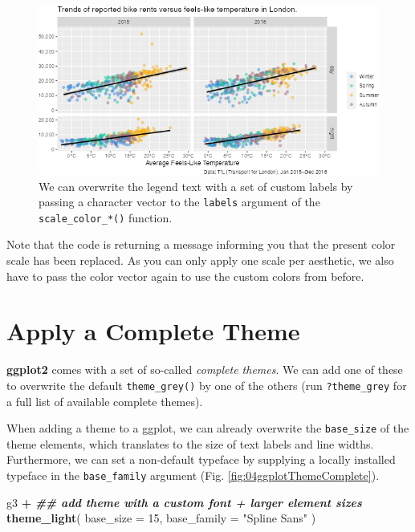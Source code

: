 \documentclass[
]{krantz}
\makeatletter
\newenvironment{Shaded}{\begin{snugshade}}{\end{snugshade}}
\newcommand{\AttributeTok}[1]{\textcolor[rgb]{0.27,0.27,0.27}{#1}}
\newcommand{\DecValTok}[1]{\textcolor[rgb]{0.06,0.06,0.06}{#1}}
\newcommand{\DocumentationTok}[1]{\textcolor[rgb]{0.37,0.37,0.37}{\textbf{\textit{#1}}}}
\newcommand{\FunctionTok}[1]{\textcolor[rgb]{0.27,0.27,0.27}{\textbf{#1}}}
\newcommand{\NormalTok}[1]{#1}
\newcommand{\SpecialCharTok}[1]{\textcolor[rgb]{0.43,0.43,0.43}{\textbf{#1}}}
\newcommand{\StringTok}[1]{\textcolor[rgb]{0.5,0.5,0.5}{#1}}
\newenvironment{kframe}{%
\medskip{}
\setlength{\fboxsep}{.8em}
 \def\at@end@of@kframe{}%
 \ifinner\ifhmode%
  \def\at@end@of@kframe{\end{minipage}}%
  \begin{minipage}{\columnwidth}%
 \fi\fi%
 \def\FrameCommand##1{\hskip\@totalleftmargin \hskip-\fboxsep
 \colorbox{shadecolor}{##1}\hskip-\fboxsep
     \hskip-\linewidth \hskip-\@totalleftmargin \hskip\columnwidth}%
 \MakeFramed {\advance\hsize-\width
   \@totalleftmargin\z@ \linewidth\hsize
   \@setminipage}}%
 {\par\unskip\endMakeFramed%
 \at@end@of@kframe}
\renewenvironment{Shaded}{\begin{kframe}}{\end{kframe}}
\makeatother
\begin{document}
\begin{figure}
\centering
\includegraphics{bookdown_files/figure-latex/04legendLabels-1.png}
\caption{\label{fig:04legendLabels}We can overwrite the legend text with a set of custom labels by passing a character vector to the \texttt{labels} argument of the \texttt{scale\_color\_*()} function.}
\end{figure}

Note that the code is returning a message informing you that the present color scale has been replaced. As you can only apply one scale per aesthetic, we also have to pass the color vector again to use the custom colors from before.

\hypertarget{complete-themes}{%
\section{Apply a Complete Theme}\label{complete-themes}}

\textbf{ggplot2} comes with a set of so-called \emph{complete themes}. We can add one of these to overwrite the default \texttt{theme\_grey()} by one of the others (run \texttt{?theme\_grey} for a full list of available complete themes).

When adding a theme to a ggplot, we can already overwrite the \texttt{base\_size} of the theme elements, which translates to the size of text labels and line widths. Furthermore, we can set a non-default typeface by supplying a locally installed typeface in the \texttt{base\_family} argument (Fig. \ref{fig:04ggplotThemeComplete}).

\begin{Shaded}
\begin{Highlighting}[]
\NormalTok{g3 }\SpecialCharTok{+}
  \DocumentationTok{\#\# add theme with a custom font + larger element sizes}
  \FunctionTok{theme\_light}\NormalTok{(}
    \AttributeTok{base\_size =} \DecValTok{15}\NormalTok{, }\AttributeTok{base\_family =} \StringTok{"Spline Sans"}
\NormalTok{  )}
\end{Highlighting}
\end{Shaded}
\end{document}
